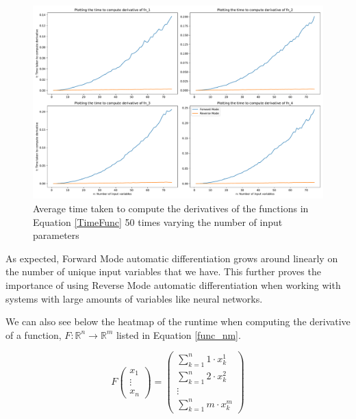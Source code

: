 \documentclass{article}
\begin{document}
\begin{figure}[h]
    \centering
    \includegraphics[width=15cm]{images/Graph_TimeDiff2.pdf}
    \caption{Average time taken to compute the derivatives of the functions in Equation \ref{TimeFunc} 50 times varying the number of input parameters}
    \label{fig:TimeDiff}
\end{figure}

As expected, Forward Mode automatic differentiation grows around linearly on the number of unique input variables that we have. This further proves the importance of using Reverse Mode automatic differentiation when working with systems with large amounts of variables like neural networks.

We can also see below the heatmap of the runtime when computing the derivative of a function, $F: \mathbb{R}^n \rightarrow \mathbb{R}^m$ listed in Equation \ref{func_nm}.

\begin{equation}
    F \begin{pmatrix}
        x_1 \\ \vdots \\ x_n
    \end{pmatrix} = \begin{pmatrix}
        \sum_{k=1}^n 1 \cdot x_k^1 \\ \sum_{k=1}^n 2 \cdot x_{k}^{2} \\ \vdots \\ \sum_{k=1}^n m \cdot x_{k}^{m}
    \end{pmatrix}
    \label{func_nm}
\end{equation}
\end{document}
